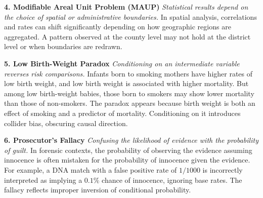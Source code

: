 \begin{tcolorbox}[
  colback=gray!2,
  colframe=gray!60,
  boxrule=0.4pt,
  width=\textwidth,
  arc=1pt,
  left=8pt,
  right=8pt,
  top=6pt,
  bottom=6pt,
  shadow={0mm}{-0.5mm}{0mm}{gray!30}
]
\vspace{1em}

\textbf{4. Modifiable Areal Unit Problem (MAUP)}  
\emph{Statistical results depend on the choice of spatial or administrative boundaries.}  
In spatial analysis, correlations and rates can shift significantly depending on how geographic regions are aggregated. A pattern observed at the county level may not hold at the district level or when boundaries are redrawn.

\vspace{1em}

\textbf{5. Low Birth-Weight Paradox}  
\emph{Conditioning on an intermediate variable reverses risk comparisons.}  
Infants born to smoking mothers have higher rates of low birth weight, and low birth weight is associated with higher mortality. But among low birth-weight babies, those born to smokers may show lower mortality than those of non-smokers. The paradox appears because birth weight is both an effect of smoking and a predictor of mortality. Conditioning on it introduces collider bias, obscuring causal direction.

\vspace{1em}

\textbf{6. Prosecutor’s Fallacy}  
\emph{Confusing the likelihood of evidence with the probability of guilt.}  
In forensic contexts, the probability of observing the evidence assuming innocence is often mistaken for the probability of innocence given the evidence. For example, a DNA match with a false positive rate of $1/1000$ is incorrectly interpreted as implying a $0.1\%$ chance of innocence, ignoring base rates. The fallacy reflects improper inversion of conditional probability.

\end{tcolorbox}

